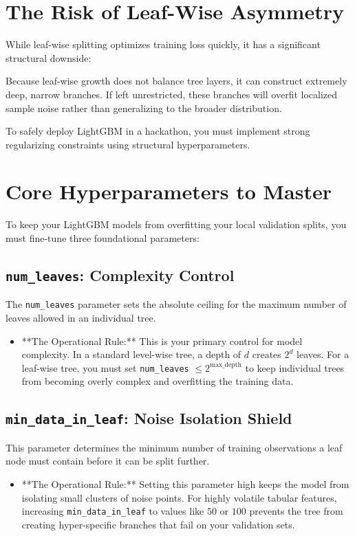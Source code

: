 \documentclass{article}
\begin{document}
\section{The Risk of Leaf-Wise Asymmetry}
While leaf-wise splitting optimizes training loss quickly, it has a significant structural downside:

\begin{tcolorbox}[colback=red!5!white,colframe=red!70!black,title=The Overfitting Threat]
Because leaf-wise growth does not balance tree layers, it can construct extremely deep, narrow branches. If left unrestricted, these branches will overfit localized sample noise rather than generalizing to the broader distribution.
\end{tcolorbox}

To safely deploy LightGBM in a hackathon, you must implement strong regularizing constraints using structural hyperparameters.

\section{Core Hyperparameters to Master}
To keep your LightGBM models from overfitting your local validation splits, you must fine-tune three foundational parameters:

\subsection{\texttt{num\_leaves}: Complexity Control}
The \texttt{num\_leaves} parameter sets the absolute ceiling for the maximum number of leaves allowed in an individual tree.
\begin{itemize}
    \item **The Operational Rule:** This is your primary control for model complexity. In a standard level-wise tree, a depth of $d$ creates $2^d$ leaves. For a leaf-wise tree, you must set \texttt{num\_leaves} $\le 2^{\text{max\_depth}}$ to keep individual trees from becoming overly complex and overfitting the training data.
\end{itemize}

\subsection{\texttt{min\_data\_in\_leaf}: Noise Isolation Shield}
This parameter determines the minimum number of training observations a leaf node must contain before it can be split further.
\begin{itemize}
    \item **The Operational Rule:** Setting this parameter high keeps the model from isolating small clusters of noise points. For highly volatile tabular features, increasing \texttt{min\_data\_in\_leaf} to values like $50$ or $100$ prevents the tree from creating hyper-specific branches that fail on your validation sets.
\end{itemize}
\end{document}
